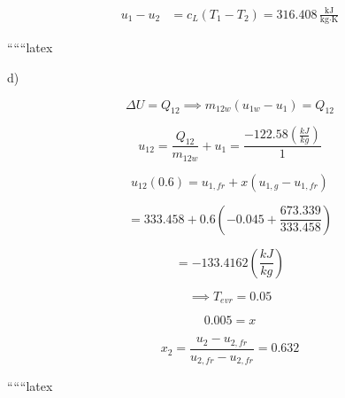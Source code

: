 \begin{align*}
    u_1 - u_2 &= c_{L} (T_1 - T_2) = \boxed{316.408 \, \frac{\text{kJ}}{\text{kg} \cdot \text{K}}}
\end{align*}

``````latex


d)

\[
\Delta U = Q_{12} \implies m_{12w} (u_{1w} - u_{1}) = Q_{12}
\]

\[
u_{12} = \frac{Q_{12}}{m_{12w}} + u_{1} = \frac{-122.58 \left( \frac{kJ}{kg} \right)}{1}
\]

\[
u_{12}(0.6) = u_{1,fr} + x \left( u_{1,g} - u_{1,fr} \right)
\]

\[
= 333.458 + 0.6 \left( -0.045 + \frac{673.339}{333.458} \right)
\]

\[
= -133.4162 \left( \frac{kJ}{kg} \right)
\]

\[
\implies T_{evr} = 0.05
\]

\[
0.005 = x
\]

\[
x_2 = \frac{u_2 - u_{2,fr}}{u_{2,fr} - u_{2,fr}} = 0.632
\]

``````latex


